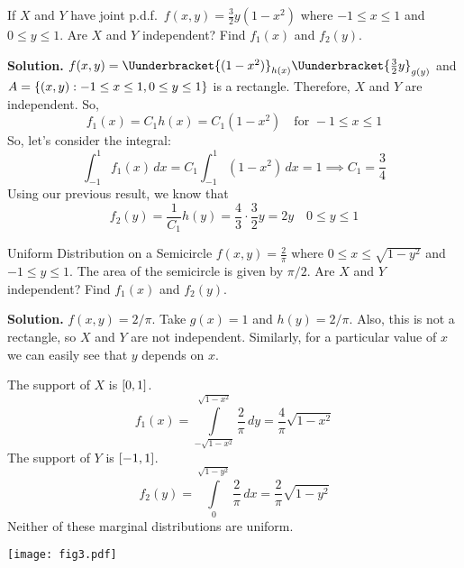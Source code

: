 \begin{Example}{}{}
    If $ X $ and $ Y $ have joint p.d.f.\
    $ \displaystyle  f(x,y)=\frac{3}{2} y(1-x^2) $
    where $ -1\le x\le 1 $ and $ 0\le y\le 1 $.
    Are $ X $ and $ Y $ independent? Find $ f_1(x) $ and $ f_2(y) $.

    \textbf{Solution.}
    $ f(x,y)=\Uunderbracket{(1-x^2)}_{h(x)} \Uunderbracket{\frac{3}{2} y}_{g(y)} $
    and $ A =\{(x,y):-1\le x\le 1,0\le y\le 1\} $
    is a rectangle. Therefore, $ X $ and $ Y $ are independent. So,
    \[ f_1(x)=C_1h(x)=C_1(1-x^2)\quad\text{for }-1\le x\le 1 \]
    So, let's consider the integral:
    \[ \int_{-1}^{1} f_1(x)\, d{x} =C_1
        \int_{-1}^{1} (1-x^2)\, d{x} =1
        \implies C_1=\frac{3}{4} \]
    Using our previous result, we know that
    \[ f_2(y)=\frac{1}{C_1} h(y)=\frac{4}{3}\cdot \frac{3}{2} y=2y
        \quad 0\le y\le 1 \]
\end{Example}

\begin{Example}{Uniform Distribution on a Semicircle}{}
    $ \displaystyle f(x,y)=\frac{2}{\pi} $ where $ 0\le x\le \sqrt{1-y^2} $
    and $ -1\le y\le 1 $. The area of the semicircle
    is given by $ \pi/2 $. Are $ X $ and $ Y $ independent? Find
    $ f_1(x) $ and $ f_2(y) $.

    \begin{minipage}{0.7\textwidth}
        \textbf{Solution.} $ f(x,y)=2/\pi $.
        Take $ g(x)=1 $ and $ h(y)=2/\pi $. Also,
        this is not a rectangle, so $ X $ and $ Y $ are not independent.
        Similarly, for a particular value of $ x $
        we can easily see that $ y $ depends on $ x $.

        The support of $ X $ is $ \interval{0}{1} $.
        \[ f_1(x)=\int\limits_{-\sqrt{1-x^2}}^{\sqrt{1-x^2}} \frac{2}{\pi} \, d{y}=
            \frac{4}{\pi}\sqrt{1-x^2}  \]
        The support of $ Y $ is $ \interval{-1}{1} $.
        \[ f_2(y)=
            \int\limits_{0}^{\sqrt{1-y^2}} \frac{2}{\pi} \, d{x}=
            \frac{2}{\pi} \sqrt{1-y^2}  \]
        Neither of these marginal distributions are uniform.
    \end{minipage}
    \begin{minipage}{0.28\textwidth}
        \texttt{[image: fig3.pdf]}
    \end{minipage}
\end{Example}
